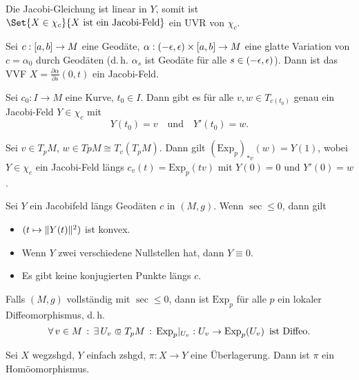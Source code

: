 \documentclass{cheat-sheet}
\newcommand{\Exp}{\mathrm{Exp}} %
\newcommand{\vinterval}{\ointerval{-\epsilon}{\epsilon}} %
\newcommand{\abinterval}{\cinterval{a}{b}} %
\begin{document}
\begin{bem}
  Die Jacobi-Gleichung ist linear in $Y$, somit ist $\Set{ X \in \chi_c }{ X \text{ ist ein Jacobi-Feld} }$ ein UVR von $\chi_c$.
\end{bem}

\begin{satz}
  Sei $c : \abinterval \to M$ eine Geodäte, $\alpha : \vinterval \times \abinterval \to M$ eine glatte Variation von $c = \alpha_0$ durch Geodäten (d.\,h. $\alpha_s$ ist Geodäte für alle $s \in \vinterval$). Dann ist das VVF $X = \tfrac{\partial \alpha}{\partial s}(0,t)$ ein Jacobi-Feld.
\end{satz}

\begin{satz}
  Sei $c_0 : I \to M$ eine Kurve, $t_0 \in I$. Dann gibt es für alle $v, w \in T_{c(t_0)}$ genau ein Jacobi-Feld $Y \in \chi_c$ mit
  \[
    Y(t_0) = v
    \quad \text{und} \quad
    Y'(t_0) = w.
  \]
\end{satz}

\begin{satz}
  Sei $v \in T_p M$, $w \in Tp M \cong T_v \left( T_p M \right)$. Dann gilt $(\Exp_p)_{*v}(w) = Y(1)$, wobei $Y \in \chi_c$ ein Jacobi-Feld längs $c_v(t) = \Exp_p(tv)$ mit $Y(0) = 0$ und $Y'(0) = w$.
\end{satz}



\begin{satz}
  Sei $Y$ ein Jacobifeld längs Geodäten $c$ in $(M, g)$. Wenn $\sec \leq 0$, dann gilt
  \begin{itemize}
    \item $(t \mapsto \lVert Y(t)\rVert^2)$ ist konvex.
    \item Wenn $Y$ zwei verschiedene Nullstellen hat, dann $Y \equiv 0$.
    \item Es gibt keine konjugierten Punkte längs $c$.
  \end{itemize}
\end{satz}

\begin{kor}
  Falls $(M, g)$ vollständig mit $\sec \leq 0$, dann ist $\Exp_p$ für alle $p$ ein lokaler Diffeomorphismus, d.\,h.
  \[
    \fa{v \in M} \ex{U_v \opn T_p M} \Exp_p |_{U_v} : U_v \to \Exp_p(U_v)
    \enspace \text{ist Diffeo.}
  \]
\end{kor}

\begin{satz}
  Sei $X$ wegzshgd, $Y$ einfach zshgd, $\pi : X \to Y$ eine Überlagerung. Dann ist $\pi$ ein Homöomorphismus.
\end{satz}
\end{document}
